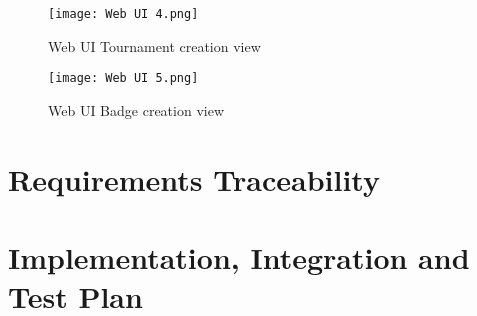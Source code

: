 \documentclass{article}
\begin{document}
\begin{figure}[H]
    \centering
    \texttt{[image: Web UI 4.png]}
    \caption{Web UI Tournament creation view}
\end{figure}

\begin{figure}[H]
    \centering
    \texttt{[image: Web UI 5.png]}
    \caption{Web UI Badge creation view}
\end{figure}

\section{Requirements Traceability}

\section{Implementation, Integration and Test Plan}
\end{document}
